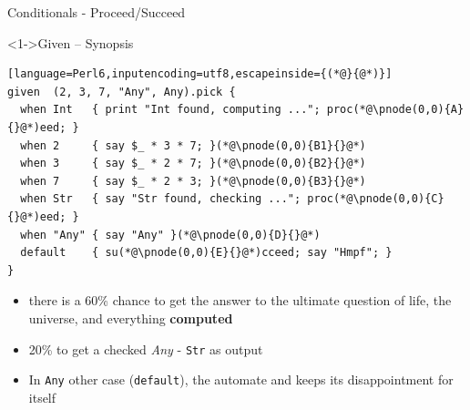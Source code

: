 \begin{frame}[fragile]{Conditionals - Proceed/Succeed}
\begin{block}<1->{Given -- Synopsis}
\small
\begin{lstlisting}[language=Perl6,inputencoding=utf8,escapeinside={(*@}{@*)}]
given  (2, 3, 7, "Any", Any).pick {
  when Int   { print "Int found, computing ..."; proc(*@\pnode(0,0){A}{}@*)eed; }
  when 2     { say $_ * 3 * 7; }(*@\pnode(0,0){B1}{}@*)
  when 3     { say $_ * 2 * 7; }(*@\pnode(0,0){B2}{}@*)
  when 7     { say $_ * 2 * 3; }(*@\pnode(0,0){B3}{}@*)
  when Str   { say "Str found, checking ..."; proc(*@\pnode(0,0){C}{}@*)eed; }
  when "Any" { say "Any" }(*@\pnode(0,0){D}{}@*)
  default    { su(*@\pnode(0,0){E}{}@*)cceed; say "Hmpf"; }
}
\end{lstlisting}
\end{block}

\begin{itemize}
\item<2->   there is a 60\% chance to get the answer to the ultimate question of life, the universe, and everything \textbf{computed}
\item<3-> 20\% to get  a checked \textit{Any} - \texttt{Str} as output
\item<4-> In \texttt{Any} other case (\texttt{default}), the automate  and keeps its disappointment for itself
\end{itemize}
\end{frame}
